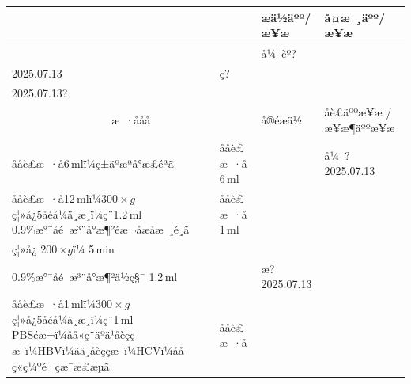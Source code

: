 \documentclass[UTF8,10pt,a4paper,fontset=fandol]{ctexart}
\newcommand{\fieldvalue}[1]{#1}
\newcommand{\handwritten}[1]{#1}
\begin{document}
\begin{tabularx}{\textwidth}{|p{}|X|p{}|p{}|}
\hline
\multicolumn{2}{|c|}{} & æä½äºº/æ¥æ & å¤æ ¸äºº/æ¥æ \\
\hline
\multicolumn{2}{|c|}{} &
\fieldvalue{\handwritten{å¼ èº?}}\\
\fieldvalue{\handwritten{2025.07.13}} &
\fieldvalue{\handwritten{ç?}}\\
\fieldvalue{\handwritten{2025.07.13?}} \\
\hline
\multicolumn{2}{|c|}{æ ·ååå} & å®éæä½ & åè£äººæ¥æ / æ¥æ¶äººæ¥æ \\
\hline
ååè£æ ·å6\,mlï¼ç±äºæªå°æ£éªã &
ååè£æ ·å
\fieldvalue{\handwritten{6}}\,ml &
\multicolumn{1}{l|}{} &
\fieldvalue{\handwritten{å¼ ?\,2025.07.13}} \\
\hline
ååè£æ ·å12\,mlï¼$300\times g$ç¦»å¿5åéå¼ä¸æ¸ï¼ç¨1.2\,ml 0.9\%æ°¯åé æ³¨å°æ¶²éæ¬åæåæ ¸é¸ã &
ååè£æ ·å
\fieldvalue{\handwritten{1}}\,ml\\
ç¦»å¿
\fieldvalue{\handwritten{200}}\,$\times g$ï¼
\fieldvalue{\handwritten{5}}\,min\\
0.9\%æ°¯åé æ³¨å°æ¶²ä½ç§¯
\fieldvalue{\handwritten{1.2}}\,ml &
\multicolumn{1}{l|}{} &
\fieldvalue{\handwritten{æ?\,2025.07.13}} \\
\hline
ååè£æ ·å1\,mlï¼$300\times g$ç¦»å¿5åéå¼ä¸æ¸ï¼ç¨1\,ml PBSéæ¬ï¼åå«ç¨äºä¹åèççæ¯ï¼HBVï¼ãä¸åèççæ¯ï¼HCVï¼ååç«ç¼ºé·çæ¯æ£æµã &
ååè£æ ·å

\end{tabularx}
\end{document}

